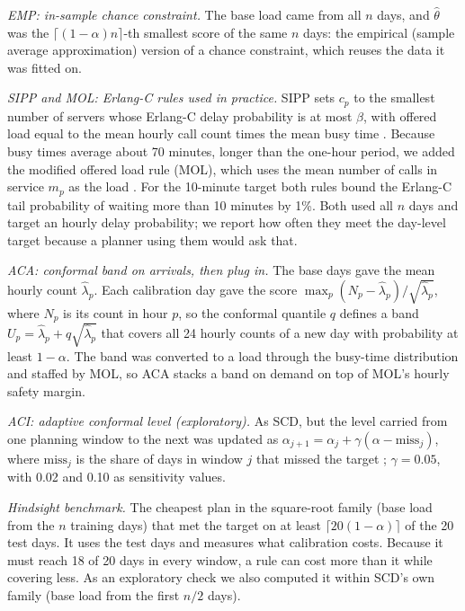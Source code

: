 \documentclass[12pt]{article}
\begin{document}
\emph{EMP: in-sample chance constraint.} The base load came from all $n$ days, and $\hat\theta$ was the $\lceil(1-\alpha)n\rceil$-th smallest score of the same $n$ days: the empirical (sample average approximation) version of a chance constraint, which reuses the data it was fitted on.

\emph{SIPP and MOL: Erlang-C rules used in practice.} SIPP sets $c_p$ to the smallest number of servers whose Erlang-C delay probability is at most $\beta$, with offered load equal to the mean hourly call count times the mean busy time \citep{green2001improving}. Because busy times average about 70 minutes, longer than the one-hour period, we added the modified offered load rule (MOL), which uses the mean number of calls in service $m_p$ as the load \citep{jennings1996server,feldman2008staffing}. For the 10-minute target both rules bound the Erlang-C tail probability of waiting more than 10 minutes by 1\%. Both used all $n$ days and target an hourly delay probability; we report how often they meet the day-level target because a planner using them would ask that.

\emph{ACA: conformal band on arrivals, then plug in.} The base days gave the mean hourly count $\hat\lambda_p$. Each calibration day gave the score $\max_p (N_p-\hat\lambda_p)/\sqrt{\hat\lambda_p}$, where $N_p$ is its count in hour $p$, so the conformal quantile $q$ defines a band $U_p=\hat\lambda_p+q\sqrt{\hat\lambda_p}$ that covers all 24 hourly counts of a new day with probability at least $1-\alpha$. The band was converted to a load through the busy-time distribution and staffed by MOL, so ACA stacks a band on demand on top of MOL's hourly safety margin.

\emph{ACI: adaptive conformal level (exploratory).} As SCD, but the level carried from one planning window to the next was updated as $\alpha_{j+1}=\alpha_j+\gamma(\alpha-\text{miss}_j)$, where $\text{miss}_j$ is the share of days in window $j$ that missed the target \citep{gibbs2021adaptive}; $\gamma=0.05$, with 0.02 and 0.10 as sensitivity values.

\emph{Hindsight benchmark.} The cheapest plan in the square-root family (base load from the $n$ training days) that met the target on at least $\lceil 20(1-\alpha)\rceil$ of the 20 test days. It uses the test days and measures what calibration costs. Because it must reach 18 of 20 days in every window, a rule can cost more than it while covering less. As an exploratory check we also computed it within SCD's own family (base load from the first $n/2$ days).
\end{document}
